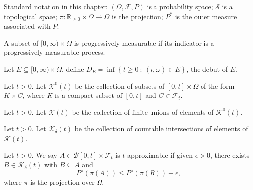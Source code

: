 Standard notation in this chapter:
$(\Omega, \mathcal{F} , P)$ is a probability space;
$\mathcal{S}$ is a topological space;
$\pi:\mathbb{R}_{\geq 0}\times\Omega\rightarrow \Omega$ is the projection; $P^*$ is the outer measure associated with $P$.

\begin{definition}\label{def:progr_meas_set}
  \leanok
A subset of $[0, \infty) \times \Omega$ is progressively measurable if its indicator is a progressively measurable process.
\end{definition}

\begin{definition}\label{def:debut_set}
  \leanok
Let $E \subseteq{} [0, \infty) \times \Omega $, define $D_E = \inf\left\lbrace t \geq 0\ :\ (t, \omega) \in E\right\rbrace$, the debut of $E$.
\end{definition}

\begin{definition}[$\mathcal{K}^0$]\label{def:subsets_compact_RNN_times_measurable}
  \leanok
Let $t>0$. Let $\mathcal{K}^0(t)$ be the collection of subsets of $[0, t] \times \Omega$ of the form $K \times C$, where $K$ is a compact
subset of $[0, t]$ and $C \in \mathcal{F}_t$.
\end{definition}

\begin{definition}[$\mathcal{K}$]\label{def:fin_union_RNN_times_measurable}
  \leanok
Let $t>0$. Let $\mathcal{K}(t)$ be the collection of finite unions of elements of $\mathcal{K}^0(t)$.
\end{definition}

\begin{definition}\label{def:count_inter_of_fin_union_RNN_times_measurable}
  \leanok
Let $t>0$. Let $\mathcal{K}_\delta(t)$ be the collection of countable intersections of elements of $\mathcal{K}(t)$.
\end{definition}

\begin{definition}\label{def:t_approx_set}
  \leanok
Let $t>0$.
We say $A \in \mathcal{B}[0, t] \times \mathcal{F}_t$ is
$t$-approximable if given $\epsilon > 0$, there exists $B \in \mathcal{K}_\delta (t)$ with $B \subseteq{} A$ and
$$P^∗ (\pi(A)) \leq P^∗ (\pi(B)) + \epsilon,$$
where $\pi$ is the projection over $\Omega$.
\end{definition}

